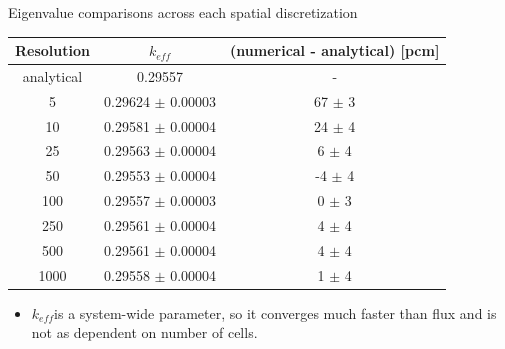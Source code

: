 \documentclass[9pt,t,aspectratio=169]{beamer}
\newcommand{\keff}{$k_{e\!f\!f}$}
\begin{document}
\begin{frame}{Eigenvalue comparisons across each spatial discretization}
    \begin{table}[H]
        \centering
        \begin{tabular}{@{}ccc@{}}
            \toprule
            Resolution &  \keff & (numerical - analytical) [pcm]\\
            \midrule
            analytical & 0.29557 & - \\
            \midrule
            5    & 0.29624 $\pm$ 0.00003 & \phantom{-}67 $\pm$ 3 \\
            10   & 0.29581 $\pm$ 0.00004 & \phantom{-}24 $\pm$ 4 \\
            25   & 0.29563 $\pm$ 0.00004 & \phantom{-}6  $\pm$ 4 \\
            50   & 0.29553 $\pm$ 0.00004 &           -4  $\pm$ 4 \\
            100  & 0.29557 $\pm$ 0.00003 & \phantom{-}0  $\pm$ 3 \\
            250  & 0.29561 $\pm$ 0.00004 & \phantom{-}4  $\pm$ 4 \\
            500  & 0.29561 $\pm$ 0.00004 & \phantom{-}4  $\pm$ 4 \\
            1000 & 0.29558 $\pm$ 0.00004 & \phantom{-}1  $\pm$ 4 \\
        \bottomrule
        \end{tabular}
    \end{table}
    \begin{itemize}
        \item \keff is a system-wide parameter, so it converges much faster than flux and is not as dependent on number of cells.
    \end{itemize}
\end{frame}
\end{document}
